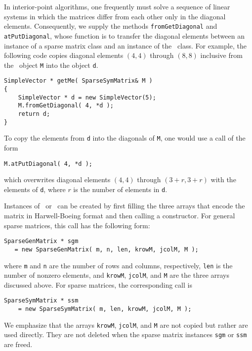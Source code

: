 In interior-point algorithms, one frequently must solve a
sequence of linear systems in which the matrices differ from each
other only in the diagonal elements. Consequently, we supply the
methods \texttt{fromGetDiagonal} and \texttt{atPutDiagonal}, whose
function is to transfer the diagonal elements between an instance of a
sparse matrix class and an instance of the \SimpleVector\ class.  For
example, the following code copies diagonal elements $(4,4)$ through
$(8,8)$ inclusive from the \SparseSymMatrix\ object \texttt{M} into
the \SimpleVector object \texttt{d}.
\begin{verbatim}
SimpleVector * getMe( SparseSymMatrix& M )
{
    SimpleVector * d = new SimpleVector(5);
    M.fromGetDiagonal( 4, *d );
    return d;
}
\end{verbatim}
To copy the elements from \texttt{d} into the diagonals of \texttt{M},
one would use a call of the form
\begin{verbatim}
M.atPutDiagonal( 4, *d );
\end{verbatim}
which overwrites diagonal elements $(4,4)$ through $(3+r,3+r)$ with
the elements of \texttt{d}, where $r$  is the number of elements
in \texttt{d}.

Instances of \SparseGenMatrix\ or \SparseSymMatrix\ can be created by
first filling the three arrays that encode the matrix in
Harwell-Boeing format and then calling a constructor. For general
sparse matrices, this call has the following form:
\begin{verbatim}
SparseGenMatrix * sgm 
   = new SparseGenMatrix( m, n, len, krowM, jcolM, M );
\end{verbatim}
where \texttt{m} and \texttt{n} are the number of rows and columns,
respectively, \texttt{len} is the number of nonzero elements, and
\texttt{krowM}, \texttt{jcolM}, and \texttt{M} are the three arrays
discussed above.  For sparse matrices, the corresponding call is
\begin{verbatim}
SparseSymMatrix * ssm 
    = new SparseSymMatrix( m, len, krowM, jcolM, M );
\end{verbatim}
We emphasize that the arrays \texttt{krowM}, \texttt{jcolM}, and
\texttt{M} are not copied but rather are used directly. They are not
deleted when the sparse matrix instances \texttt{sgm} or \texttt{ssm}
are freed.

